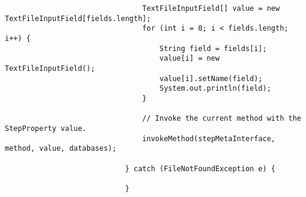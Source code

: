 \documentclass[
  11pt,
]{krantz}
\begin{document}
\begin{verbatim}
                                TextFileInputField[] value = new TextFileInputField[fields.length];
                                for (int i = 0; i < fields.length; i++) {
                                    String field = fields[i];
                                    value[i] = new TextFileInputField();
                                    value[i].setName(field);
                                    System.out.println(field);
                                }

                                // Invoke the current method with the StepProperty value.
                                invokeMethod(stepMetaInterface, method, value, databases);

                            } catch (FileNotFoundException e) {

                            }
\end{verbatim}

  

\printindex
\end{document}
